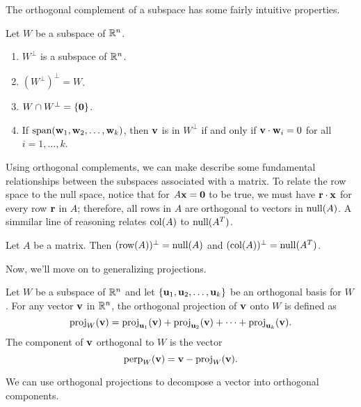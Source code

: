 \documentclass[../m073main.tex]{subfiles}
\begin{document}
The orthogonal complement of a subspace has some fairly intuitive properties.

\begin{theorem}
	Let $W$ be a subspace of $\mathbb{R}^n$.
	\begin{enumerate}[label=(\alph*)]
		\item $W^\perp$ is a subspace of $\mathbb{R}^n$.
		\item $\left( W^\perp \right)^\perp = W$.
		\item $W \cap W^\perp = \{\mathbf{0}\}$.
		\item If $\textrm{span}(\mathbf{w}_1, \mathbf{w}_2, \ldots, \mathbf{w}_k)$, then $\mathbf{v}$ is in $W^\perp$ if and only if $\mathbf{v} \cdot \mathbf{w}_i = 0$ for all $i = 1, \ldots, k$.
	\end{enumerate}
\end{theorem}

Using orthogonal complements, we can make describe some fundamental relationships between the subspaces associated with a matrix.
To relate the row space to the null space, notice that for $A \mathbf{x} = \mathbf{0}$ to be true, we must have $\mathbf{r} \cdot \mathbf{x}$ for every row $\mathbf{r}$ in $A$; therefore, all rows in $A$ are orthogonal to vectors in $\textrm{null}(A)$.
A simmilar line of reasoning relates $\textrm{col}(A)$ to $\textrm{null}(A^T)$. 

\begin{theorem}
	Let $A$ be a matrix.
	Then $(\textrm{row}(A))^\perp = \textrm{null}(A)$ and $(\textrm{col}(A))^\perp = \textrm{null}(A^T)$.
\end{theorem}

Now, we'll move on to generalizing projections.

\begin{definition}
	Let $W$ be a subspace of $\mathbb{R}^n$ and let $\{\mathbf{u}_1, \mathbf{u}_2, \ldots, \mathbf{u}_k\}$ be an orthogonal basis for $W$.
	For any vector $\mathbf{v}$ in $\mathbb{R}^n$, the orthogonal projection of $\mathbf{v}$ onto $W$ is defined as
	\[ \textrm{proj}_W(\mathbf{v}) = \textrm{proj}_{\mathbf{u}_1}(\mathbf{v}) + \textrm{proj}_{\mathbf{u}_2}(\mathbf{v}) + \cdots + \textrm{proj}_{\mathbf{u}_k}(\mathbf{v}). \]
	The component of $\mathbf{v}$ orthogonal to $W$ is the vector
	\[ \textrm{perp}_W(\mathbf{v}) = \mathbf{v} - \textrm{proj}_W(\mathbf{v}). \]
\end{definition}

We can use orthogonal projections to decompose a vector into orthogonal components.
\end{document}
